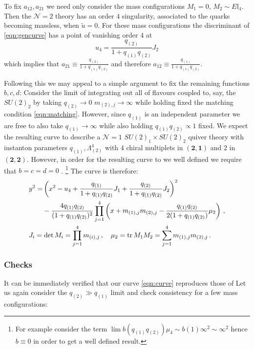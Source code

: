 \documentclass[main.tex]{subfiles}
\begin{document}
To fix $a_{12},a_{21}$ we need only consider the mass configurations $M_1=0$, $M_2\sim E\mathbb{I}_4$. Then the $\mathcal{N}=2$ theory has an order $4$ singularity, associated to the quarks becoming massless, when $\tilde{u}=0$. For these mass configurations the discriminant of \eqref{eqn:gencurve} has a point of vanishing order $4$ at  
\begin{equation}\label{eqn:singpt}
u_4=\frac{q_{(2)}}{1+q_{(1)}q_{(2)}}J_2
\end{equation}
which implies that $a_{21}\equiv \frac{q_{(2)}}{1+q_{(1)}q_{(2)}}$ and therefore $a_{12}\equiv \frac{q_{(1)}}{1+q_{(1)}q_{(2)}}$.

Following this we may appeal to a simple argument to fix the remaining functions $b,c,d$: Consider the limit of integrating out all of flavours coupled to, say, the $SU(2)_2$ by taking $q_{(2)}\to 0$ $m_{(2),j}\to\infty$ while holding fixed the matching condition \eqref{eqn:matching}. However, since $q_{(1)}$ is an independent parameter we are free to also take $q_{(1)}\to\infty$ while also holding $q_{(1)}{q_{(2)}}\propto1$ fixed. We expect the resulting curve to describe a $\mathcal{N}=1$ $SU(2)_1\times SU(2)_2$ quiver theory with instanton parameters $q_{(1)},\Lambda_{(2)}^4$ with $4$ chiral multiplets in $(\mathbf{2},\mathbf{1})$ and $2$ in $(\mathbf{2},\mathbf{2})$. However, in order for the resulting curve to we well defined we require that $b=c=d=0$ . \footnote{For example consider the term $\lim b(q_{(1)}q_{(2)})\mu_4\sim b(1)\infty^2\sim \infty^2$ hence $b\equiv0$ in order to get a well defined result.} The curve is therefore:
\begin{align}\label{eqn:curve}
&\begin{aligned}
y^2=&\left(x^2-u_4+\frac{q_{(1)}}{1+q_{(1)}q_{(2)}}J_1+\frac{q_{(2)}}{1+q_{(1)}q_{(2)}}J_2\right)^2\\
&-\frac{4q_{(1)}q_{(2)}}{(1+q_{(1)}q_{(2)})^2}\prod_{j=1}^4\left(x+m_{(1),j}m_{(2),j}-\frac{q_{(1)}q_{(2)}}{2(1+q_{(1)}q_{(2)})}\mu_2\right)\,,
\end{aligned}\\
&J_i=\det M_i=\prod_{j=1}^4m_{(i),j}\,,\quad \mu_2=\operatorname{tr} M_1M_2=\sum_{j=1}^4m_{(1),j}m_{(2),j}\,.
\end{align}
\subsubsection{Checks}
It can be immediately verified that our curve \eqref{eqn:curve} reproduces those of \cite{Gremm:1997sz,Intriligator:1994sm}
Let us again consider the $q_{(2)}\gg q_{(1)}$ limit and check consistency for a few mass configurations:
\end{document}
